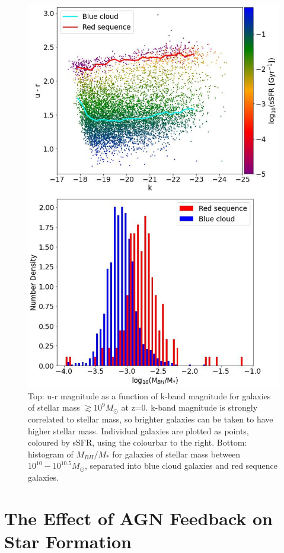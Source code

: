 \documentclass[12pt]{article}%
\begin{document}
\begin{figure}[H]
\centering
\includegraphics[width=14.5cm]{Plot_1.jpeg}
\caption{Top: u-r magnitude as a function of k-band magnitude for galaxies of stellar mass $\gtrsim10^9M_\odot$ at z=0. k-band magnitude is strongly correlated to stellar mass, so brighter galaxies can be taken to have higher stellar mass. Individual galaxies are plotted as points, coloured by sSFR, using the colourbar to the right. Bottom: histogram of $M_{BH}/M_*$ for galaxies of stellar mass between $10^{10} - 10^{10.5}M_\odot$, separated into blue cloud galaxies and red sequence galaxies.}
\label{fig:2}
\end{figure}
\twocolumngrid


\section{The Effect of AGN Feedb\-ack on Star Formation}
\end{document}
